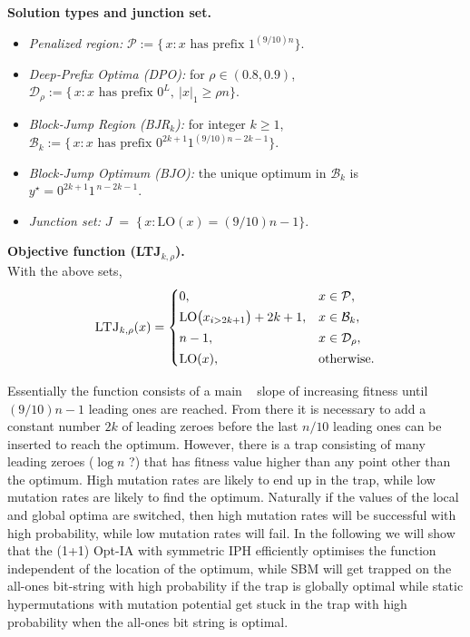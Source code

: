 \medskip\noindent
\textbf{Solution types and junction set.}\\
\begin{itemize}
	\item \emph{Penalized region:}\quad
	$\displaystyle
	\mathcal{P}
	:= \bigl\{\,x:\text{$x$ has prefix }1^{(9/10)n}\bigr\}.
	$
	\item \emph{Deep‐Prefix Optima (DPO):} for $\rho\in(0.8,0.9)$,
	$\displaystyle
	\mathcal{D}_\rho
	:= \bigl\{\,x:\text{$x$ has prefix }0^L,\ |x|_1\ge \rho n\bigr\}.
	$
	\item \emph{Block‐Jump Region (BJR$_k$):} for integer $k\ge1$,
	$\displaystyle
	\mathcal{B}_k
	:= \bigl\{\,x:\text{$x$ has prefix }0^{2k+1}1^{(9/10)n-2k-1}\bigr\}.
	$
	\item \emph{Block‐Jump Optimum (BJO):}\quad
	the unique optimum in $\mathcal{B}_k$ is $y^\star = 0^{2k+1}1^{\,n-2k-1}$.
	\item \emph{Junction set:}\quad
	$\displaystyle
	J \;=\; \bigl\{\,x:\mathrm{LO}(x)=(9/10)n-1\bigr\}.
	$
\end{itemize}

\medskip\noindent
\textbf{Objective function (\textsc{LTJ}$_{k,\rho}$).}\\
With the above sets,
\[
\textsc{LTJ}_{k,\rho}(x)
=\begin{cases}
	0,                          & x\in\mathcal{P},\\[2pt]
	\mathrm{LO}\bigl(x_{i>2k+1}\bigr)+2k+1, & x\in\mathcal{B}_k,\\[2pt]
	n-1,                        & x\in\mathcal{D}_\rho,\\[2pt]
	\mathrm{LO}(x),             & \text{otherwise.}
\end{cases}
\]


Essentially the function consists of a  main \leadingones~ slope of increasing fitness until $(9/10)n -1$ leading ones are reached. From there it is necessary to add a constant number $2k$ of leading zeroes before the last $n/10$ leading ones can be inserted to reach the optimum. However, there is a trap consisting of many leading zeroes ($\log n$ ?) that has fitness value higher than any point other than the optimum. High mutation rates are likely to end up in the trap, while low mutation rates are likely to find the optimum. Naturally  if the values of the local and global optima are switched, then high mutation rates will be successful with high probability, while low mutation rates will fail. In the following we will show that the (1+1) Opt-IA with symmetric IPH efficiently optimises the function independent of the location of the optimum, while SBM will get trapped on the all-ones bit-string with high probability if the trap is globally optimal while static hypermutations with mutation potential get stuck in the trap with high probability when the all-ones bit string is optimal.


